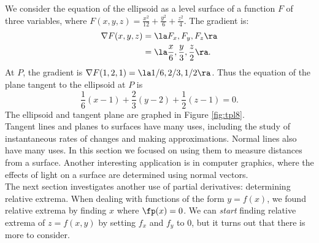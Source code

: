 {We consider the equation of the ellipsoid as a level surface of a function $F$ of three variables, where $F(x,y,z) = \frac{x^2}{12} +\frac{y^2}{6}+\frac{z^2}{4}$.  The gradient is:
\begin{align*}
\nabla F(x,y,z) &= \la F_x, F_y,F_z\ra \\
			&= \la \frac x6, \frac y3, \frac z2\ra.
\end{align*}
At  $P$, the gradient is $\nabla F(1,2,1) = \la 1/6, 2/3, 1/2\ra$. Thus the equation of the plane tangent to the ellipsoid at $P$ is
\[
\frac 16(x-1) + \frac23(y-2) + \frac 12(z-1) = 0.
\]
The ellipsoid and tangent plane are graphed in Figure \ref{fig:tpl8}.
}\\

Tangent lines and planes to surfaces have many uses, including the study of instantaneous rates of changes and making approximations. Normal lines also have many uses. In this section we focused on using them to measure distances from a surface. Another interesting application is in computer graphics, where the effects of light on a surface are determined using normal vectors.\\

The next section investigates another use of partial derivatives: determining relative extrema. When dealing with functions of the form $y=f(x)$, we found relative extrema  by finding $x$ where $\fp(x) = 0$. We can \textit{start} finding relative extrema of $z=f(x,y)$ by setting $f_x$ and $f_y$ to 0, but it turns out that there is more to consider.

